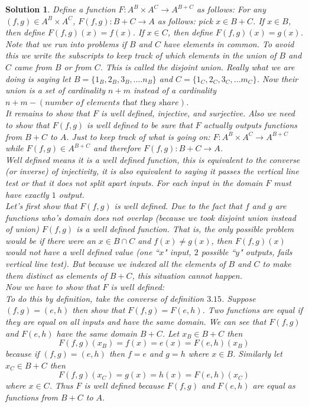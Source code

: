 \documentclass{article}
\theoremstyle{problemstyle}
\theoremstyle{problemstyle}
\newtheorem{solution}{Solution}
\theoremstyle{problemstyle}
\begin{document}
\begin{solution}
Define a function $F:A^B \times A^C \rightarrow A^{B+C}$ as follows: 
For any $(f,g) \in A^B \times A^C$, $F(f,g):B+C \rightarrow A$ as follows: pick $x \in B+C$. If $x \in B$, then define $F(f,g)(x) = f(x)$. If $x \in C$, then define $F(f,g)(x) = g(x)$.\\

Note that we run into problems if $B$ and $C$ have elements in common. To avoid this we write the subscripts to keep track of which elements in the union of $B$ and $C$ came from $B$ or from $C$. This is called the disjoint union. Really what we are doing is saying let $B = \{1_B,2_B,3_B,....n_B\}$ and $C = \{1_C,2_C,3_C,...m_C\}$. Now their union is a set of cardinality $n+m$ instead of a cardinality $n+m - (\textit{number of elements that they share})$. \\

It remains to show that $F$ is well defined, injective, and surjective. Also we need to show that $F(f,g)$ is well defined to be sure that $F$ actually outputs functions from $B+C$ to $A$. Just to keep track of what is going on: $F:A^B \times A^C \rightarrow A^{B+C}$ while $F(f,g) \in A^{B+C}$ and therefore $F(f,g):B+C \rightarrow A$.\\  

Well defined means it is a well defined function, this is equivalent to the converse (or inverse) of injectivity, it is also equivalent to saying it passes the vertical line test or that it does not split apart inputs. For each input in the domain $F$ must have exactly $1$ output.\\   

Let's first show that $F(f,g)$ is well defined. Due to the fact that $f$ and $g$ are functions who's domain does not overlap (because we took disjoint union instead of union) $F(f,g)$ is a well defined function. That is, the only possible problem would be if there were an $x \in B \cap C$ and $f(x) \neq g(x)$, then $F(f,g)(x)$ would not have a well defined value (one ``$x$" input, $2$ possible ``$y$" outputs, fails vertical line test). But because we indexed all the elements of $B$ and $C$ to make them distinct as elements of $B+C$, this situation cannot happen.\\ 

Now we have to show that $F$ is well defined:\\

To do this by definition, take the converse of definition $3.15$. Suppose $(f,g) = (e,h)$ then show that $F(f,g) = F(e,h)$. Two functions are equal if they are equal on all inputs and have the same domain. We can see that $F(f,g)$ and $F(e,h)$ have the same domain $B+C$. Let $x_B \in B+C$ then $$F(f,g)(x_B) = f(x) = e(x) = F(e,h)(x_B)$$ because if $(f,g) = (e,h)$ then $f = e$ and $g = h$ where $x \in B$. Similarly let $x_C \in B+C$ then $$F(f,g)(x_C) = g(x) = h(x) = F(e,h)(x_C)$$ where $x \in C$.  Thus $F$ is well defined because $F(f,g)$ and $F(e,h)$ are equal as functions from $B+C$ to $A$.\\


\end{solution}
\end{document}
